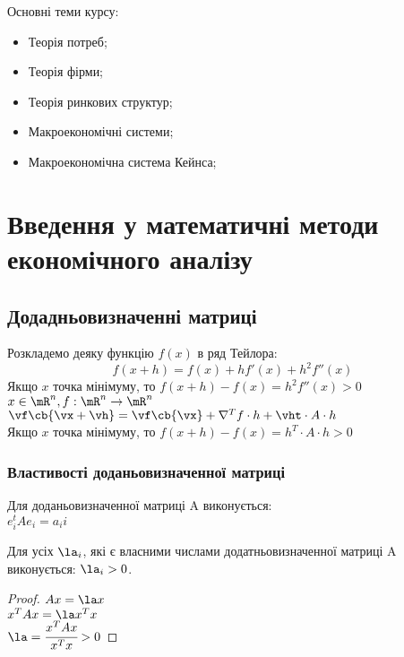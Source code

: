 Основні теми курсу:
\begin{itemize}
\item Теорія потреб;
\item Теорія фірми; 
\item Теорія ринкових структур;
\item Макроекономічні системи;
\item Макроекономічна система Кейнса;
\end{itemize}
\section{Введення у математичні методи економічного аналізу}
\subsection{Додадньовизначенні матриці}
Розкладемо деяку функцію $f(x)$ в ряд Тейлора:
\begin{equation}
f(x+h) = f(x)+hf'(x)+h^2f''(x)
\end{equation}
Якщо $x$ точка мінімуму, то $f(x+h)-f(x)=h^2f''(x)>0$\\
$x\in\mR^n,f:\mR^n\to\mR^n$\\
$\vf\cb{\vx+\vh} = \vf\cb{\vx}+\nabla^Tf \cdot h + \vht \cdot A \cdot h$\\
Якщо $x$ точка мінімуму, то $f(x+h)-f(x) = h^T \cdot A \cdot h > 0$
\subsubsection{Властивості доданьовизначенної матриці}
\begin{teor}
Для доданьовизначенної матриці A виконується:\\
$e_i^t A e_i = a_ii$
\end{teor}
\begin{teor}
Для усіх $\la_i$, які є власними числами додатньовизначенної матриці A виконується: $\la_i>0$.
\end{teor}
\begin{proof}
$Ax=\la x$ \\
$x^T A x = \la x^T x$ \\
$\la = \cfrac{x^T A x}{x^T x} > 0$
\end{proof}
